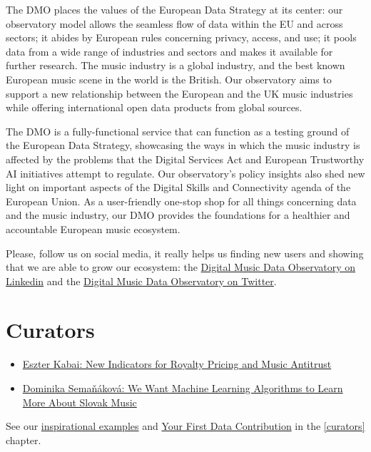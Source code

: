 \documentclass[
  a4paper,
  openany, a4paper, oneside]{book}
\begin{document}
The DMO places the values of the European Data Strategy at its center: our observatory model allows the seamless flow of data within the EU and across sectors; it abides by European rules concerning privacy, access, and use; it pools data from a wide range of industries and sectors and makes it available for further research. The music industry is a global industry, and the best known European music scene in the world is the British. Our observatory aims to support a new relationship between the European and the UK music industries while offering international open data products from global sources.

The DMO is a fully-functional service that can function as a testing ground of the European Data Strategy, showcasing the ways in which the music industry is affected by the problems that the Digital Services Act and European Trustworthy AI initiatives attempt to regulate. Our observatory's policy insights also shed new light on important aspects of the Digital Skills and Connectivity agenda of the European Union. As a user-friendly one-stop shop for all things concerning data and the music industry, our DMO provides the foundations for a healthier and accountable European music ecosystem.

Please, follow us on social media, it really helps us finding new users and showing that we are able to grow our ecosystem: the \href{https://www.linkedin.com/company/reprexbv/}{Digital Music Data Observatory on Linkedin} and the \href{https://twitter.com/dataandlyrics}{Digital Music Data Observatory on Twitter}.

\hypertarget{music-curators}{%
\section{Curators}\label{music-curators}}

\begin{itemize}
\item
  \href{https://music.dataobservatory.eu/post/2021-06-02-data-curator-eszter-kabai/}{Eszter Kabai: New Indicators for Royalty Pricing and Music Antitrust}
\item
  \href{https://music.dataobservatory.eu/author/dominika-semanakova/}{Dominika Semaňáková: We Want Machine Learning Algorithms to Learn More About Slovak Music}
\end{itemize}

See our \href{\%7B\#get-inspired\%7D}{inspirational examples} and \protect\hyperlink{first-contribution}{Your First Data Contribution} in the \ref{curators} chapter.
\end{document}
